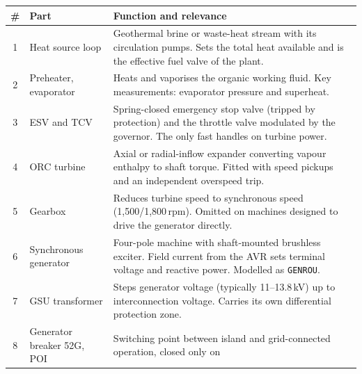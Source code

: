 \begin{table}[htbp]
  \centering
  \renewcommand{\arraystretch}{1.25}
  \begin{tabularx}{\linewidth}{@{}c l X@{}}
    \toprule
    \textbf{\#} & \textbf{Part} & \textbf{Function and relevance} \\
    \midrule
    1  & Heat source loop      & Geothermal brine or waste-heat stream with its
                                 circulation pumps. Sets the total heat
                                 available and is the effective fuel valve of
                                 the plant. \\
    2  & Preheater, evaporator & Heats and vaporises the organic working fluid.
                                 Key measurements: evaporator pressure and
                                 superheat. \\
    3  & ESV and TCV           & Spring-closed emergency stop valve (tripped by
                                 protection) and the throttle valve modulated by
                                 the governor. The only fast handles on turbine
                                 power. \\
    4  & ORC turbine           & Axial or radial-inflow expander converting
                                 vapour enthalpy to shaft torque. Fitted with
                                 speed pickups and an independent overspeed
                                 trip. \\
    5  & Gearbox               & Reduces turbine speed to synchronous speed
                                 (1{,}500/1{,}800\,rpm). Omitted on machines
                                 designed to drive the generator directly. \\
    6  & Synchronous generator & Four-pole machine with shaft-mounted brushless
                                 exciter. Field current from the AVR sets
                                 terminal voltage and reactive power. Modelled
                                 as \texttt{GENROU}. \\
    7  & GSU transformer       & Steps generator voltage (typically
                                 11--13.8\,kV) up to interconnection voltage.
                                 Carries its own differential protection
                                 zone. \\
    8  & Generator breaker 52G, POI
                               & Switching point between island and
                                 grid-connected operation, closed only on

\end{tabularx}
\end{table}
